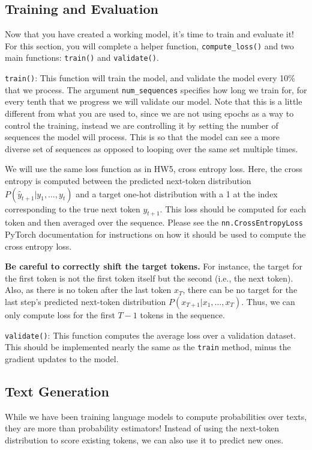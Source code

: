 \documentclass[11pt,addpoints,answers]{exam}
\begin{document}
\subsection{Training and Evaluation}\label{train_and_eval}

Now that you have created a working model, it's time to train and evaluate it! For this section, you will complete a helper function, \texttt{compute\_loss()} and two main functions: \texttt{train()} and \texttt{validate()}.

\texttt{train()}: This function will train the model, and validate the model every 10\% that we process. The argument \texttt{num\_sequences} specifies how long we train for, for every tenth that we progress we will validate our model. Note that this is a little different from what you are used to, since we are not using epochs as a way to control the training, instead we are controlling it by setting the number of sequences the model will process. This is so that the model can see a more diverse set of sequences as opposed to looping over the same set multiple times.

We will use the same loss function as in HW5, cross entropy loss. Here, the cross entropy is computed between the predicted next-token distribution $P(\hat{y}_{t+1}|y_1, \ldots, y_t)$ and a target one-hot distribution with a 1 at the index corresponding to the true next token $y_{t+1}$. This loss should be computed for each token and then averaged over the sequence. Please see the \texttt{nn.CrossEntropyLoss} PyTorch documentation for instructions on how it should be used to compute the cross entropy loss.

\textbf{Be careful to correctly shift the target tokens.} For instance, the target for the first token is not the first token itself but the second (i.e., the next token). Also, as there is no token after the last token $x_T$, there can be no target for the last step's predicted next-token distribution $P(x_{T+1} | x_1, \ldots, x_T)$. Thus, we can only compute loss for the first $T-1$ tokens in the sequence.

\texttt{validate()}: This function computes the average loss over a validation dataset. This should be implemented nearly the same as the \texttt{train} method, minus the gradient updates to the model.

\subsection{Text Generation}
While we have been training language models to compute probabilities over texts, they are more than probability estimators! Instead of using the next-token distribution to score existing tokens, we can also use it to predict new ones.
\end{document}
